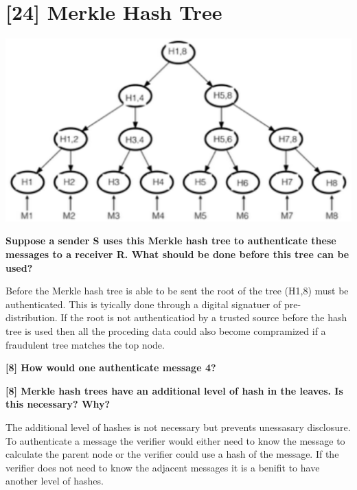 \documentclass[letterpaper,11pt,notitlepage,fleqn]{article}
\begin{document}
\section{[24] Merkle Hash Tree}
\begin{center}
    \includegraphics[scale=0.5]{tree.eps}
\end{center}

\noindent \textbf{Suppose a sender S uses this Merkle hash tree to authenticate these messages to a receiver R. What should be done before this tree can be used?}

Before the Merkle hash tree is able to be sent the root of the tree (H1,8) must be authenticated. This is tyically done through a digital signatuer of pre-distribution. If the root is not authenticatiod by a trusted source before the hash tree is used then all the proceding data could also become compramized if a fraudulent tree matches the top node. 

\noindent \textbf{[8] How would one authenticate message 4?}
 

\noindent \textbf{[8] Merkle hash trees have an additional level of hash in the leaves. Is this necessary? Why?}

The additional level of hashes is not necessary but prevents unessasary disclosure. To authenticate a message the verifier would either need to know the message to calculate the parent node or the verifier could use a hash of the message. If the verifier does not need to know the adjacent messages it is a benifit to have another level of hashes. 
\end{document}
